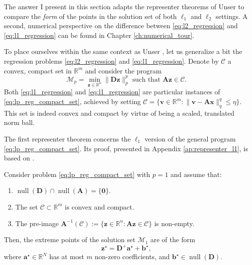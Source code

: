 The answer I present in this section adapts the representer theorems of Unser \etal \cite{unser2016,unser2016a} to compare the \emph{form} of the points in the solution set of both $\ell_1$ and $\ell_2$ settings. A second, numerical perspective on the difference between \eqref{eq:l2_regression} and \eqref{eq:l1_regression} can be found in Chapter \ref{ch:numerical_tour}.

To place ourselves within the same context as Unser \etal, let us generalize a bit the regression problems \eqref{eq:l2_regression} and \eqref{eq:l1_regression}. Denote by $\mathcal{C}$ a convex, compact set in $\mathbb{R}^{m}$ and consider the program
\begin{equation}
    \mathcal{M}_p = \underset{\mathbf{z} \in \mathbb{R}^{n}}{\min} \| \mathbf{D z} \|_p^p \text{ such that } \mathbf{Az} \in \mathcal{C}. \label{eq:lp_reg_compact_set}
\end{equation}
Both \eqref{eq:l1_regression} and \eqref{eq:l1_regression} are particular instances of \eqref{eq:lp_reg_compact_set}, achieved by setting $\mathcal{C} = \{\mathbf{v} \in \mathbb{R}^{m} : \| \mathbf{v - Ax} \|_q^q \leq \eta\}$. This set is indeed convex and compact by virtue of being a scaled, translated norm ball.

The first representer theorem concerns the $\ell_1$ version of the general program \eqref{eq:lp_reg_compact_set}. Its proof, presented in Appendix \ref{ap:representer_l1}, is based on \cite[Theorem 19]{unser2016}.

\begin{theorem}\label{thm:l1_representer}
    Consider problem \eqref{eq:lp_reg_compact_set} with $p=1$ and assume that:
    \begin{enumerate}
        \item $\operatorname{null} \left ( \mathbf{D} \right ) \cap \operatorname{null} \left ( \mathbf{A} \right ) = \{ \mathbf{0} \}$.
        \item \label{ass:compact_convex} The set $\mathcal{C} \subset \mathbb{R}^{m}$ is convex and compact.
        \item \label{ass:feasible} The pre-image $\mathbf{A}^{-1}(\mathcal{C}) := \{\mathbf{z} \in \mathbb{R}^{n}: \mathbf{Az} \in \mathcal{C}\}$ is non-empty.
    \end{enumerate}
    Then, the extreme points of the solution set $\mathcal{M}_1$ are of the form
    \begin{equation}
        \mathbf{z}^\star = \mathbf{D}^+ \mathbf{a}^\star + \mathbf{b}^\star,
    \end{equation}
    where $\mathbf{a}^\star \in \mathbb{R}^{N}$ has at most $m$ non-zero coefficients, and $\mathbf{b}^\star \in \operatorname{null} \left ( \mathbf{D} \right )$.
\end{theorem}

